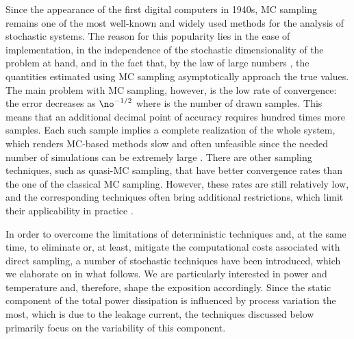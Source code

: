 Since the appearance of the first digital computers in 1940s, \ac{MC} sampling
remains one of the most well-known and widely used methods for the analysis of
stochastic systems. The reason for this popularity lies in the ease of
implementation, in the independence of the stochastic dimensionality of the
problem at hand, and in the fact that, by the law of large numbers
\cite{durrett2010}, the quantities estimated using \ac{MC} sampling
asymptotically approach the true values. The main problem with \ac{MC} sampling,
however, is the low rate of convergence: the error decreases as $\no^{-1/2}$
where \no is the number of drawn samples. This means that an additional decimal
point of accuracy requires hundred times more samples. Each such sample implies
a complete realization of the whole system, which renders \ac{MC}-based methods
slow and often unfeasible since the needed number of simulations can be
extremely large \cite{diaz-emparanza2002}. There are other sampling techniques,
such as quasi-\ac{MC} sampling, that have better convergence rates than the one
of the classical \ac{MC} sampling. However, these rates are still relatively
low, and the corresponding techniques often bring additional restrictions, which
limit their applicability in practice \cite{xiu2010}.

In order to overcome the limitations of deterministic techniques and, at the
same time, to eliminate or, at least, mitigate the computational costs
associated with direct sampling, a number of stochastic techniques have been
introduced, which we elaborate on in what follows. We are particularly
interested in power and temperature and, therefore, shape the exposition
accordingly. Since the static component of the total power dissipation is
influenced by process variation the most, which is due to the leakage current,
the techniques discussed below primarily focus on the variability of this
component.

